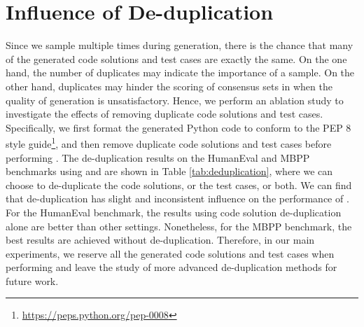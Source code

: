 \section{Influence of De-duplication}
\label{appendix_dedup}
Since we sample multiple times during generation, there is the chance that many of the generated code solutions and test cases are exactly the same. On the one hand, the number of duplicates may indicate the importance of a sample. On the other hand, duplicates may hinder the scoring of consensus sets in \ours when the quality of generation is unsatisfactory. Hence, we perform an ablation study to investigate the effects of removing duplicate code solutions and test cases.
Specifically, we first format the generated Python code to conform to the PEP 8 style guide\footnote{\url{https://peps.python.org/pep-0008}}, and then remove duplicate code solutions and test cases before performing \ours. The de-duplication results on the HumanEval and MBPP benchmarks using \ours and \cushman are shown in Table \ref{tab:deduplication}, where we can choose to de-duplicate the code solutions, or the test cases, or both. We can find that de-duplication has slight and inconsistent influence on the performance of \ours. For the HumanEval benchmark, the  results using code solution de-duplication alone are better than other settings. Nonetheless, for the MBPP benchmark, the best  results are achieved without de-duplication. Therefore, in our main experiments, we reserve all the generated code solutions and test cases when performing \ours and leave the study of more advanced de-duplication methods for future work.



